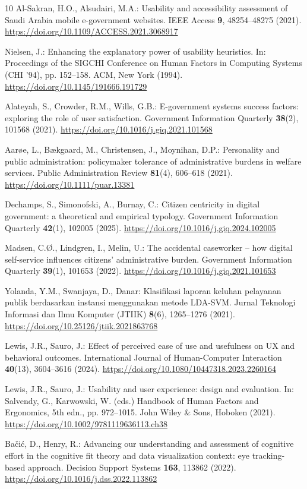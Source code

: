\documentclass[11pt, runningheads, a4paper]{llncs}
\begin{document}
\begin{thebibliography}{10}
Al-Sakran, H.O., Alsudairi, M.A.: Usability and accessibility assessment of Saudi
Arabia mobile e-government websites. IEEE Access \textbf{9}, 48254--48275 (2021).
\url{https://doi.org/10.1109/ACCESS.2021.3068917}

Nielsen, J.: Enhancing the explanatory power of usability heuristics. In: Proceedings
of the SIGCHI Conference on Human Factors in Computing Systems (CHI '94),
pp. 152--158. ACM, New York (1994).
\url{https://doi.org/10.1145/191666.191729}

Alateyah, S., Crowder, R.M., Wills, G.B.: E-government systems success factors:
exploring the role of user satisfaction. Government Information Quarterly
\textbf{38}(2), 101568 (2021).
\url{https://doi.org/10.1016/j.giq.2021.101568}

Aar{\o}e, L., B{\ae}kgaard, M., Christensen, J., Moynihan, D.P.: Personality and
public administration: policymaker tolerance of administrative burdens in
welfare services. Public Administration Review \textbf{81}(4), 606--618 (2021).
\url{https://doi.org/10.1111/puar.13381}

Dechamps, S., Simonofski, A., Burnay, C.: Citizen centricity in digital
government: a theoretical and empirical typology. Government Information
Quarterly \textbf{42}(1), 102005 (2025).
\url{https://doi.org/10.1016/j.giq.2024.102005}

Madsen, C.{\O}., Lindgren, I., Melin, U.: The accidental caseworker -- how digital
self-service influences citizens' administrative burden. Government Information
Quarterly \textbf{39}(1), 101653 (2022).
\url{https://doi.org/10.1016/j.giq.2021.101653}

Yolanda, Y.M., Swanjaya, D., Danar: Klasifikasi laporan keluhan pelayanan publik
berdasarkan instansi menggunakan metode LDA-SVM. Jurnal Teknologi Informasi dan
Ilmu Komputer (JTIIK) \textbf{8}(6), 1265--1276 (2021).
\url{https://doi.org/10.25126/jtiik.2021863768}

Lewis, J.R., Sauro, J.: Effect of perceived ease of use and usefulness on UX
and behavioral outcomes. International Journal of Human-Computer Interaction
\textbf{40}(13), 3604--3616 (2024).
\url{https://doi.org/10.1080/10447318.2023.2260164}

Lewis, J.R., Sauro, J.: Usability and user experience: design and evaluation.
In: Salvendy, G., Karwowski, W. (eds.) Handbook of Human Factors and Ergonomics,
5th edn., pp. 972--1015. John Wiley \& Sons, Hoboken (2021).
\url{https://doi.org/10.1002/9781119636113.ch38}

Ba\v{c}i\'{c}, D., Henry, R.: Advancing our understanding and assessment of
cognitive effort in the cognitive fit theory and data visualization context:
eye tracking-based approach. Decision Support Systems \textbf{163}, 113862 (2022).
\url{https://doi.org/10.1016/j.dss.2022.113862}

\end{thebibliography}
\end{document}
